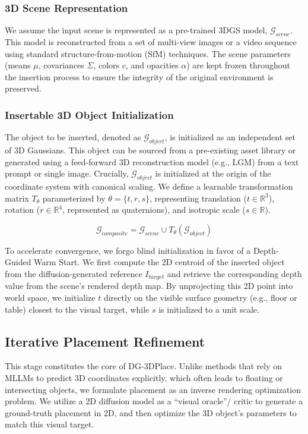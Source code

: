 \documentclass[pdflatex,sn-mathphys-num]{sn-jnl}%
\theoremstyle{thmstyleone}%
\theoremstyle{thmstyletwo}%
\theoremstyle{thmstylethree}%
\begin{document}
\subsubsection{3D Scene Representation}
We assume the input scene is represented as a pre-trained 3DGS model, $\mathcal{G}_{scene}$. This model is reconstructed from a set of multi-view images or a video sequence using standard structure-from-motion (SfM) techniques. The scene parameters (means $\mu$, covariances $\Sigma$, colors $c$, and opacities $\alpha$) are kept frozen throughout the insertion process to ensure the integrity of the original environment is preserved.

\subsubsection{Insertable 3D Object Initialization}
The object to be inserted, denoted as $\mathcal{G}_{object}$, is initialized as an independent set of 3D Gaussians. This object can be sourced from a pre-existing asset library or generated using a feed-forward 3D reconstruction model (e.g., LGM) from a text prompt or single image. Crucially, $\mathcal{G}_{object}$ is initialized at the origin of the coordinate system with canonical scaling. We define a learnable transformation matrix $T_{\theta}$ parameterized by $\theta = \{t, r, s\}$, representing translation ($t \in \mathbb{R}^3$), rotation ($r \in \mathbb{R}^4$, represented as quaternions), and isotropic scale ($s \in \mathbb{R}$).

\[
\mathcal{G}_{composite} = \mathcal{G}_{scene} \cup T_{\theta}(\mathcal{G}_{object})
\]

To accelerate convergence, we forgo blind initialization in favor of a Depth-Guided Warm Start. We first compute the 2D centroid of the inserted object from the diffusion-generated reference $I_{target}$ and retrieve the corresponding depth value from the scene's rendered depth map. By unprojecting this 2D point into world space, we initialize $t$ directly on the visible surface geometry (e.g., floor or table) closest to the visual target, while $s$ is initialized to a unit scale.

\subsection{Iterative Placement Refinement}
This stage constitutes the core of DG-3DPlace. Unlike methods that rely on MLLMs to predict 3D coordinates explicitly, which often leads to floating or intersecting objects, we formulate placement as an inverse rendering optimization problem. We utilize a 2D diffusion model as a ``visual oracle''/ critic to generate a ground-truth placement in 2D, and then optimize the 3D object's parameters to match this visual target.
\\
\end{document}
